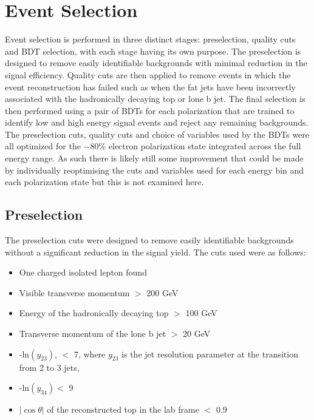 \section{Event Selection}
\label{Event Selection}

Event selection is performed in three distinct stages: preselection, quality cuts and \ac{BDT} selection, with each stage having its own purpose. The preselection is designed to remove easily identifiable backgrounds with minimal reduction in the signal efficiency. Quality cuts are then applied to remove events in which the event reconstruction has failed such as when the fat jets have been incorrectly associated with the hadronically decaying top or lone b jet. The final selection is then performed using a pair of \ac{BDT}s for each polarization that are trained to identify low and high energy signal events and reject any remaining backgrounds. The preselection cuts, quality cuts and choice of variables used by the \ac{BDT}s were all optimized for the $-$80\% electron polarization state integrated across the full energy range. As such there is likely still some improvement that could be made by individually reoptimising the cuts and variables used for each energy bin and each polarization state but this is not examined here.

\subsection{Preselection}

The preselection cuts were designed to remove easily identifiable backgrounds without a significant reduction in the signal yield. The cuts used were as follows:

\begin{itemize}
\item One charged isolated lepton found
\item Visible transverse momentum $>$ 200 GeV
\item Energy of the hadronically decaying top $>$ 100 GeV
\item Transverse momentum of the lone b jet $>$ 20 GeV
\item -ln$(y_{23})$, $<$ 7, where $y_{23}$ is the jet resolution parameter at the transition from 2 to 3 jets,
\item -ln$(y_{34}) <$ 9
\item $|\cos\theta|$ of the reconstructed top in the lab frame $<$ 0.9
\end{itemize}

